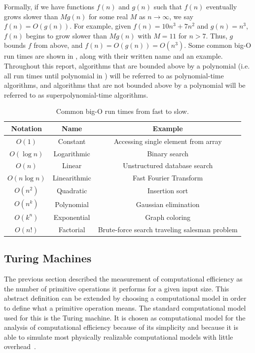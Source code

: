 Formally, if we have functions $f(n)$ and $g(n)$ such that $f(n)$ eventually grows slower than $Mg(n)$ for some real $M$ as $n \to \infty$, we say $f(n) = O(g(n))$.
For example, given $f(n) = 10n^3 + 7n^2$ and $g(n) = n^3$, $f(n)$ begins to grow slower than $Mg(n)$ with $M = 11$ for $n > 7$.
Thus, $g$ bounds $f$ from above, and $f(n) = O(g(n)) = O(n^3)$.
Some common big-O run times are shown in , along with their written name and an example.
Throughout this report, algorithms that are bounded above by a polynomial (i.e. all run times until polynomial in ) will be referred to as polynomial-time algorithms, and algorithms that are not bounded above by a polynomial will be referred to as superpolynomial-time algorithms.

\begin{table}[ht]
    \centering
    {\renewcommand{\arraystretch}{1.1}
        \begin{tabular}{ c|c|c }
            Notation & Name & Example \\
            \hline
            $O(1)$ & Constant & Accessing single element from array \\
            $O(\log n)$ & Logarithmic & Binary search \\
            $O(n)$ & Linear & Unstructured database search \\
            $O(n \log n)$ & Linearithmic & Fast Fourier Transform \\
            $O(n^2)$ & Quadratic & Insertion sort \\
            $O(n^k)$ & Polynomial & Gaussian elimination \\
            $O(k^n)$ & Exponential & Graph coloring \\
            $O(n!)$ & Factorial & Brute-force search traveling salesman problem \\
        \end{tabular}
    }
    \caption{Common big-O run times from fast to slow.}
    \label{table:common-big-o}
\end{table}

\subsection{Turing Machines}
The previous section described the measurement of computational efficiency as the number of primitive operations it performs for a given input size.
This abstract definition can be extended by choosing a computational model in order to define what a primitive operation means.
The standard computational model used for this is the Turing machine.
It is chosen as computational model for the analysis of computational efficiency because of its simplicity and because it is able to simulate most physically realizable computational models with little overhead~\cite{arora2009computational}.

